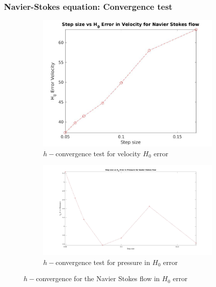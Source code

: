\documentclass{beamer}
\begin{document}
\begin{frame}
\frametitle{Navier-Stokes equation: Convergence test}
\begin{figure}
\begin{subfigure}{0.4\textwidth}	
  \includegraphics[width=\linewidth]{H0_convergence_velocity_n_s.jpg}
  \caption{$h-$convergence test for velocity $H_0$ error}
  \label{fig:vel_navier_stoke_conv_h0}
\end{subfigure}
\begin{subfigure}{0.4\textwidth}	
  \includegraphics[width=\linewidth]{H0_convergence_pressure_n_s.jpg}
  \caption{$h-$convergence test for pressure in $H_0$ error}
  \label{fig:pre_navier_stoke_conv_h0}
\end{subfigure}
\caption{$h-$convergence for the Navier Stokes flow in $H_0$ error}
\label{navier_stoke_conv_h0}
\end{figure}
\end{frame}
\end{document}
